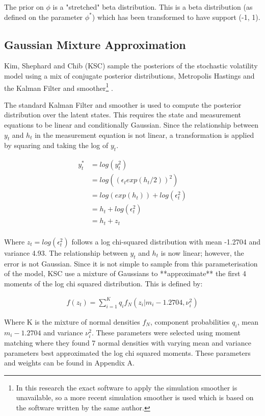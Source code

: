 \documentclass[12pt, a4paper]{article}
\begin{document}
        The prior on $\phi$ is a "stretched" beta distribution. This is a beta distribution (as defined on the parameter $\phi^*$) which has been transformed to have support (-1, 1).

    \subsection{Gaussian Mixture Approximation}
        Kim, Shephard and Chib (KSC) sample the posteriors of the stochastic volatility model using a mix of conjugate posterior distributions, Metropolis Hastings and the Kalman Filter and smoother\footnote{In this research the exact software to apply the simulation smoother is unavailable, so a more recent simulation smoother is used which is based on the software written by the same author.} \citep{dejong1995}.

        The standard Kalman Filter and smoother is used to compute the posterior distribution over the latent states. This requires the state and measurement equations to be linear and conditionally Gaussian. Since the relationship between $y_t$ and $h_t$ in the measurement equation is not linear, a transformation is applied by squaring and taking the log of $y_t$.

        $$
        \begin{aligned}
        y_t^{*} &= log(y_t^2) \\ 
        &= log((\epsilon_t exp(h_t/2))^2) \\
        &=  log(exp(h_t)) + log(\epsilon_t^2) \\
        &= h_t + log(\epsilon_t^2)  \\
        &= h_t + z_t \\
        \end{aligned}
        $$

        Where $z_t = log(\epsilon_t^2)$ follows a log chi-squared distribution with mean -1.2704 and variance 4.93. The relationship between $y_t$ and $h_t$ is now linear; however, the error is not Gaussian. Since it is not simple to sample from this parameterisation of the model, KSC use a mixture of Gaussians to **approximate** the first 4 moments of the log chi squared distribution. This is defined by:

        $$
        \begin{aligned}
        f(z_t) = \sum_{i=1}^{K} q_if_N(z_i|m_i-1.2704, \nu_i^2)
        \end{aligned}
        $$

        Where K is the mixture of normal densities $f_N$, component probabilities $q_i$, mean $m_i-1.2704$ and variance $\nu_i^2$. These parameters were selected using moment matching where they found 7 normal densities with varying mean and variance parameters best approximated the log chi squared moments. These parameters and weights can be found in Appendix A.
\end{document}
